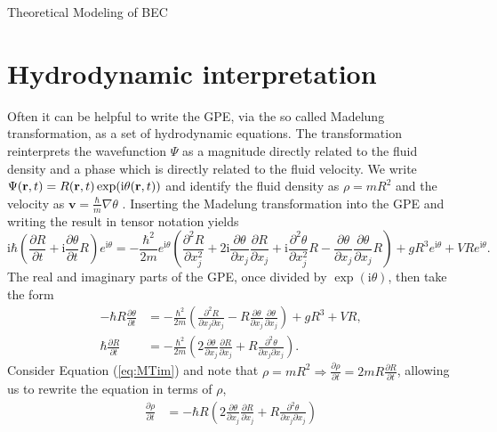 \begin{chapter}{\label{cha:theoretical_model}Theoretical Modeling of BEC}
\section{\label{section:hydrodynamic} Hydrodynamic interpretation}
	Often it can be helpful to write the GPE, via the so called Madelung transformation, as a set of hydrodynamic equations. The transformation reinterprets the wavefunction $\Psi$ as a magnitude directly related to the fluid density and a phase which is directly related to the fluid velocity. We write $\Psi({\bf r},t) = R({\bf r},t)\exp (\mathrm{i}\theta({\bf r},t))$ and identify the fluid density as $\rho=mR^2$ and the velocity as $\mathbf{v} = \frac{\hbar}{m}\nabla\theta$ .
	Inserting the Madelung transformation into the GPE and writing the result in tensor notation yields
	\begin{equation*}
		\mathrm{i}\hbar\left( \frac{\partial R}{\partial t} + \mathrm{i}\frac{\partial \theta}{\partial t} R \right)e^{\mathrm{i}\theta} =
		-\frac{\hbar^2}{2m}e^{\mathrm{i}\theta}\left( \frac{\partial^2 R}{\partial x_j^2} + 2\mathrm{i}\frac{\partial \theta}{\partial x_j}\frac{\partial R}{\partial x_j}+
		\mathrm{i}\frac{\partial^2 \theta}{\partial x_j^2}R -  \frac{\partial \theta}{\partial x_j}\frac{\partial \theta}{\partial x_j} R  \right) + gR^3e^{\mathrm{i}\theta} + VRe^{\mathrm{i}\theta}.
	\end{equation*}
	The real and imaginary parts of the GPE, once divided by $\exp (\mathrm{i}\theta)$, then take the form
	\begin{align}
		-\hbar R \frac{\partial \theta}{\partial t} &= -\frac{\hbar^2}{2m}\left( \frac{\partial^2 R}{\partial x_j \partial x_j} - R \frac{\partial \theta}{\partial x_j}\frac{\partial \theta}{\partial x_j}  \right) + gR^3 + VR, \label{eq:MTre}\\
		\hbar \frac{\partial R}{\partial t} &= -\frac{\hbar^2}{2m}\left( 2\frac{\partial \theta}{\partial x_j}\frac{\partial R}{\partial x_j} + R \frac{\partial^2 \theta}{\partial x_j \partial x_j} \right).
		\label{eq:MTim}
	\end{align}
	Consider Equation (\ref{eq:MTim}) and note that $\rho = mR^2 \Rightarrow \frac{\partial \rho}{\partial t} = 2mR\frac{\partial R}{\partial t}$, allowing us to rewrite the equation in terms of $\rho$,
	\begin{align*}
		\frac{\partial \rho}{\partial t} &= -\hbar R\left( 2 \frac{\partial \theta}{\partial x_j} \frac{\partial R}{\partial x_j} + R \frac{\partial^2 \theta}{\partial x_j\partial x_j} \right)\\

\end{align*}
\end{chapter}
